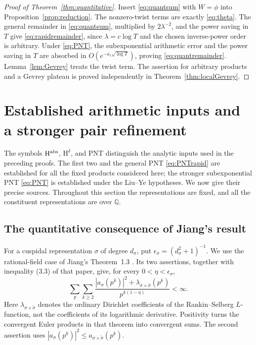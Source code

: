 \documentclass[11pt]{article}
\numberwithin{equation}{section}
\theoremstyle{remark}
\newcommand{\Q}{\mathbb Q}
\begin{document}
\begin{proof}[Proof of Theorem~\ref{thm:quantitative}]
Insert \eqref{eq:quantsum} with $W=\phi$ into
Proposition~\ref{prop:reduction}. The nonzero-twist terms are exactly
\eqref{eq:theta}. The general remainder in \eqref{eq:quantsum},
multiplied by $2\lambda^{-2}$, and the power saving in $T$ give
\eqref{eq:rapidremainder}, since $\lambda=c\log T$ and the chosen
inverse-power order is arbitrary. Under \eqref{eq:PNT}, the
subexponential arithmetic error and the power saving in $T$ are
absorbed in $O(e^{-a_1\sqrt{\log T}})$, proving
\eqref{eq:quantremainder}. Lemma~\ref{lem:Gevrey} treats the twist
term. The assertion for arbitrary products and a Gevrey plateau is
proved independently in Theorem~\ref{thm:localGevrey}.
\end{proof}

\section{Established arithmetic inputs and a stronger pair refinement}
\label{sec:established}

The symbols $\mathrm H^{\rm abs}$, $\mathrm H^\delta$, and
$\mathrm{PNT}$ distinguish the analytic inputs used in the preceding
proofs. The first two and the general PNT \eqref{eq:PNTrapid} are
established for all the fixed products considered here; the stronger
subexponential PNT \eqref{eq:PNT} is established under the Liu--Ye
hypotheses. We now give their precise sources. Throughout this section the
representations are fixed, and all the constituent representations are
over $\Q$.

\subsection{The quantitative consequence of Jiang's result}

For a cuspidal representation $\sigma$ of degree $d_\sigma$, put
$\epsilon_\sigma=(d_\sigma^2+1)^{-1}$. We use the rational-field case of
Jiang's Theorem~1.3 \cite{Jiang}. Its two assertions, together with
inequality (3.3) of that paper, give, for every
$0<\eta<\epsilon_\sigma$,
\begin{equation}\label{eq:Jianginput}
 \sum_p\sum_{k\ge2}
 \frac{|a_\sigma(p^k)|^2+
       \lambda_{\sigma\times\widetilde\sigma}(p^k)}
      {p^{k(1-\eta)}}<\infty.
\end{equation}
Here $\lambda_{\sigma\times\widetilde\sigma}$ denotes the ordinary
Dirichlet coefficients of the Rankin--Selberg $L$-function, not the
coefficients of its logarithmic derivative. Positivity turns the
convergent Euler products in that theorem into convergent sums. The
second assertion uses
$|a_\sigma(p^k)|^2\le a_{\sigma\times\widetilde\sigma}(p^k)$.
\end{document}
